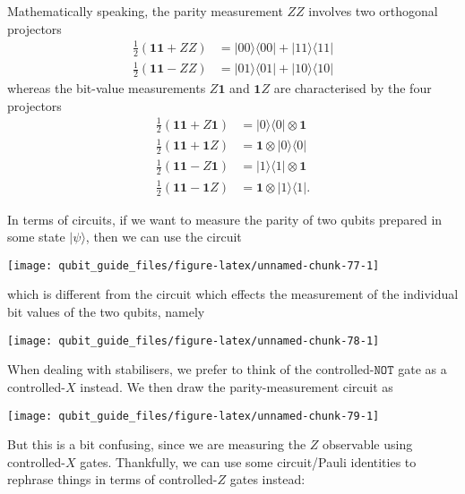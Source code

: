 \documentclass[fleqn]{article}
\begin{document}
Mathematically speaking, the parity measurement \(ZZ\) involves two orthogonal projectors
\[
  \begin{aligned}
    \frac{1}{2}(\mathbf{1}\mathbf{1}+ZZ)
    &= |00\rangle\langle 00|+|11\rangle\langle 11|
  \\\frac{1}{2}(\mathbf{1}\mathbf{1}-ZZ)
    &= |01\rangle\langle 01|+|10\rangle\langle 10|
  \end{aligned}
\]
whereas the bit-value measurements \(Z\mathbf{1}\) and \(\mathbf{1}Z\) are characterised by the four projectors
\[
  \begin{aligned}
    \frac{1}{2}(\mathbf{1}\mathbf{1}+Z\mathbf{1})
    &= |0\rangle\langle 0|\otimes\mathbf{1}
  \\\frac{1}{2}(\mathbf{1}\mathbf{1}+\mathbf{1}Z)
    &= \mathbf{1}\otimes|0\rangle\langle 0|
  \\\frac{1}{2}(\mathbf{1}\mathbf{1}-Z\mathbf{1})
    &= |1\rangle\langle 1|\otimes\mathbf{1}
  \\\frac{1}{2}(\mathbf{1}\mathbf{1}-\mathbf{1}Z)
    &= \mathbf{1}\otimes|1\rangle\langle 1|.
  \end{aligned}
\]

In terms of circuits, if we want to measure the parity of two qubits prepared in some state \(|\psi\rangle\), then we can use the circuit

\begin{center}\texttt{[image: qubit\_guide\_files/figure-latex/unnamed-chunk-77-1]} \end{center}

which is different from the circuit which effects the measurement of the individual bit values of the two qubits, namely

\begin{center}\texttt{[image: qubit\_guide\_files/figure-latex/unnamed-chunk-78-1]} \end{center}

When dealing with stabilisers, we prefer to think of the controlled-\(\texttt{NOT}\) gate as a controlled-\(X\) instead.
We then draw the parity-measurement circuit as

\begin{center}\texttt{[image: qubit\_guide\_files/figure-latex/unnamed-chunk-79-1]} \end{center}

But this is a bit confusing, since we are measuring the \(Z\) observable using controlled-\(X\) gates.
Thankfully, we can use some circuit/Pauli identities to rephrase things in terms of controlled-\(Z\) gates instead:
\end{document}
